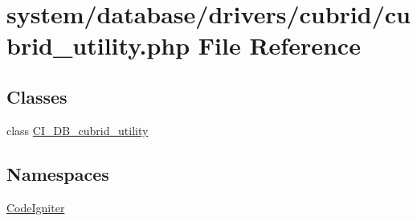 \hypertarget{cubrid__utility_8php}{}\section{system/database/drivers/cubrid/cubrid\+\_\+utility.php File Reference}
\label{cubrid__utility_8php}
\subsection*{Classes}
\begin{DoxyCompactItemize}
\item 
class \mbox{\hyperlink{class_c_i___d_b__cubrid__utility}{C\+I\+\_\+\+D\+B\+\_\+cubrid\+\_\+utility}}
\end{DoxyCompactItemize}
\subsection*{Namespaces}
\begin{DoxyCompactItemize}
\item 
 \mbox{\hyperlink{namespace_code_igniter}{Code\+Igniter}}
\end{DoxyCompactItemize}
